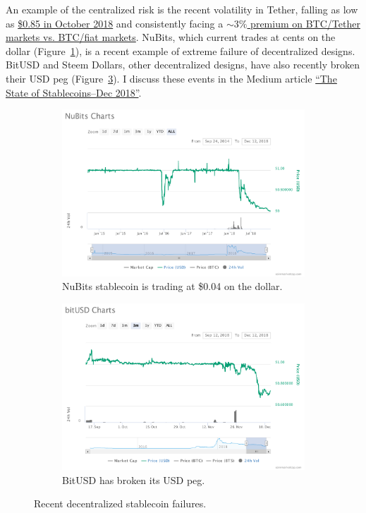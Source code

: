 \documentclass[10pt]{article}
\begin{document}
An example of the centralized risk is the recent volatility in Tether, falling as low as \href{https://www.ccn.com/bitcoin-price-explodes-to-7500-as-tether-loses-usd-peg/}{\$0.85 in October 2018} and consistently facing a \href{https://www.lykke.com/trading-indicators}{$\sim3\%$ premium on BTC/Tether markets vs. BTC/fiat markets}. NuBits, which current trades at cents on the dollar (Figure~\ref{fig:nubits_chart}), is a recent example of extreme failure of decentralized designs. BitUSD and Steem Dollars, other decentralized designs, have also recently broken their USD peg (Figure~\ref{fig:bitusd_chart}). I discuss these events in the Medium article \href{https://medium.com/@aklamun/the-state-of-stablecoins-update-2018-56fb82efe6de}{``The State of Stablecoins--Dec 2018''}.

\begin{figure}
	\centering
	\begin{subfigure}[b]{0.48\textwidth}
		\includegraphics[width=\textwidth]{nubits_chart}
		\caption{NuBits stablecoin is trading at \$0.04 on the dollar.}\label{fig:nubits_chart}
	\end{subfigure}
	\begin{subfigure}[b]{0.48\textwidth}
		\includegraphics[width=\textwidth]{bitusd_chart}
		\caption{BitUSD has broken its USD peg.}\label{fig:bitusd_chart}
	\end{subfigure}
	\caption{Recent decentralized stablecoin failures.}
\end{figure}
\end{document}
